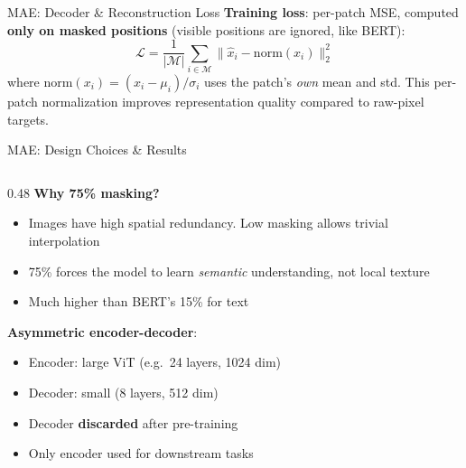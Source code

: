 \begin{frame}{MAE: Decoder \& Reconstruction Loss}
  \vspace{0.3em}
  \textbf{Training loss}: per-patch MSE, computed \textbf{only on masked positions} (visible positions are ignored, like BERT):
  \[
    \mathcal{L} = \frac{1}{|\mathcal{M}|} \sum_{i \in \mathcal{M}} \bigl\| \hat{x}_i - \mathrm{norm}(x_i) \bigr\|_2^2
  \]
  where $\mathrm{norm}(x_i) = (x_i - \mu_i)/\sigma_i$ uses the patch's \emph{own} mean and std. This per-patch normalization improves representation quality compared to raw-pixel targets.
\end{frame}

\begin{frame}{MAE: Design Choices \& Results}

  \begin{columns}
    \begin{column}{0.48\textwidth}
      \textbf{Why 75\% masking?}
      \begin{itemize}
        \item Images have high spatial redundancy. Low masking allows trivial interpolation
        \item 75\% forces the model to learn \emph{semantic} understanding, not local texture
        \item Much higher than BERT's 15\% for text
      \end{itemize}

      \vspace{0.3em}
      \textbf{Asymmetric encoder-decoder}:
      \begin{itemize}
        \item Encoder: large ViT (e.g.\ 24 layers, 1024 dim)
        \item Decoder: small (8 layers, 512 dim)
        \item Decoder \textbf{discarded} after pre-training
        \item Only encoder used for downstream tasks
      \end{itemize}


\end{column}
\end{columns}
\end{frame}

